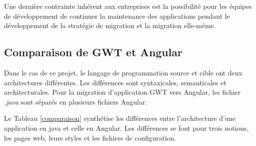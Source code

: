 \documentclass[11pt,]{article}
\begin{document}
Une dernière contrainte inhérent aux entreprises est la possibilité pour
les équipes de développement de continuer la maintenance des
applications pendant le développement de la stratégie de migration et la
migration elle-même.

\hypertarget{comparaison-de-gwt-et-angular}{%
\subsection{Comparaison de GWT et
Angular}\label{comparaison-de-gwt-et-angular}}

\begin{table}[hbtp]
    \caption{Comparaison des architectures de GWT et Angular}
    \label{comparaison}
    \begin {center}
    \end{center}
\end{table}

Dans le cas de ce projet, le langage de programmation source et cible
ont deux architectures différentes. Les différences sont syntaxicales,
semanticales et architecturales. Pour la migration d'application GWT
vers Angular, les fichier \emph{.java} sont séparés en plusieurs
fichiers Angular.

Le Tableau \ref{comparaison} synthétise les différences entre
l'architecture d'une application en java et celle en Angular. Les
différences se font pour trois notions, les pages web, leurs styles et
les fichiers de configuration.
\end{document}
